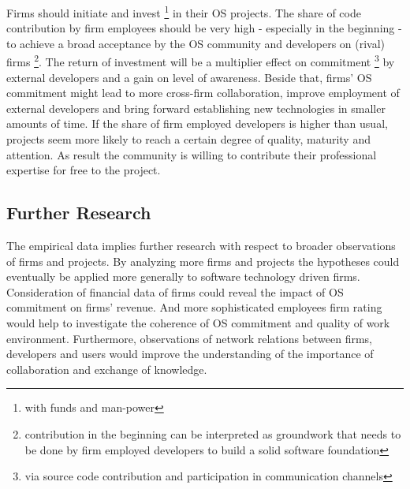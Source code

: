 Firms should initiate and invest \footnote{with funds and man-power} in their OS projects. The share of code contribution by firm employees should be very high - especially in the beginning - to achieve a broad acceptance by the OS community and developers on (rival) firms \footnote{contribution in the beginning can be interpreted as groundwork that needs to be done by firm employed developers to build a solid software foundation}. The return of investment will be a multiplier effect on commitment \footnote{via source code contribution and participation in communication channels} by external developers and a gain on level of awareness. Beside that, firms' OS commitment might lead to more cross-firm collaboration, improve employment of external developers and bring forward establishing new technologies in smaller amounts of time. If the share of firm employed developers is higher than usual, projects seem more likely to reach a certain degree of quality, maturity and attention. As result the community is willing to contribute their professional expertise for free to the project.


\subsection{Further Research}
\label{sec:further_research}

The empirical data implies further research with respect to broader observations of firms and projects. By analyzing more firms and projects the hypotheses could eventually be applied more generally to software technology driven firms. Consideration of financial data of firms could reveal the impact of OS commitment on firms' revenue. And more sophisticated employees firm rating would help to investigate the coherence of OS commitment and quality of work environment. Furthermore, observations of network relations between firms, developers and users would improve the understanding of the importance of collaboration and exchange of knowledge.
%

